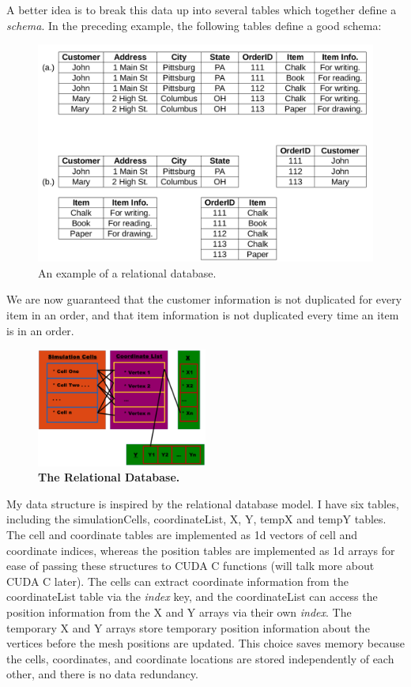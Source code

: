 A better idea is to break this data up into several tables which 
together define a \emph{schema}. In the preceding example, the following tables define a good schema:
\begin{figure}
\centering
\includegraphics[width=\textwidth]{../diagrams/relationaldb.png}
\caption{An example of a relational database.}
\label{fig:rdb}
\end{figure}


We are now guaranteed that the customer information is not duplicated for every item in an order, and that item information is not duplicated every time an item is in an order.

\begin{figure}[h]
\centering
\includegraphics[width=0.5\textwidth]{../diagrams/ds.png}
\caption{\textbf{The Relational Database.}}
\end{figure}

My data structure is inspired by the relational database model. I have six tables, including the simulationCells, coordinateList, X, Y, tempX and tempY tables. The cell and coordinate tables are implemented as 1d vectors of cell and coordinate indices, whereas the position tables are implemented as 1d arrays for ease of passing these structures to CUDA C functions (will talk more about CUDA C later). The cells can extract coordinate information from the coordinateList table via the \emph{index} key, and the coordinateList can access the position information from the X and Y arrays via their own \emph{index}. The temporary X and Y arrays store temporary position information about the vertices before the mesh positions are updated. This choice saves memory because the cells, coordinates, and coordinate locations are stored independently of each other, and there is no data redundancy. 

